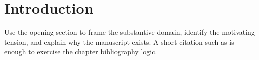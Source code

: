 \section{Introduction}

Use the opening section to frame the substantive domain, identify the motivating tension, and explain why the manuscript exists. A short citation such as \textcite{doe2026} is enough to exercise the chapter bibliography logic.
